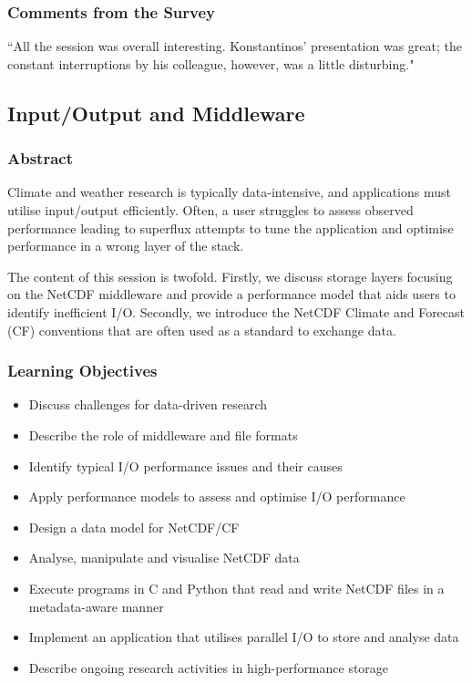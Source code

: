 \subsubsection{Comments from the Survey}

``All the session was overall interesting. Konstantinos' presentation was great; the constant interruptions by his colleague, however, was a little disturbing."

\subsection{Input/Output and Middleware}
\label{sec:ioam}

\subsubsection{Abstract}

Climate and weather research is typically data-intensive, and applications must utilise input/output efficiently. Often, a user struggles to assess observed performance leading to superflux attempts to tune the application and optimise performance in a wrong layer of the stack.

The content of this session is twofold. Firstly, we discuss storage layers focusing on the NetCDF middleware and provide a performance model that aids users to identify inefficient I/O. Secondly, we introduce the NetCDF Climate and Forecast (CF) conventions that are often used as a standard to exchange data.

\subsubsection{Learning Objectives}

\begin{itemize}

\item Discuss challenges for data-driven research
\item Describe the role of middleware and file formats
\item Identify typical I/O performance issues and their causes
\item Apply performance models to assess and optimise I/O performance
\item Design a data model for NetCDF/CF
\item Analyse, manipulate and visualise NetCDF data
\item Execute programs in C and Python that read and write NetCDF files in a metadata-aware manner
\item Implement an application that utilises parallel I/O to store and analyse data
\item Describe ongoing research activities in high-performance storage

\end{itemize}

